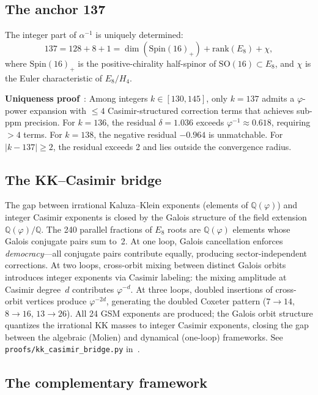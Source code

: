 \documentclass[aps,prd,twocolumn,superscriptaddress,nofootinbib,showpacs]{revtex4-2}
\begin{document}
\subsection{The anchor 137}\label{sec:anchor137}

The integer part of $\alpha^{-1}$ is uniquely determined:
\begin{equation}
137 = 128 + 8 + 1 = \dim(\text{Spin}(16)_+) + \text{rank}(E_8) + \chi,
\label{eq:137}
\end{equation}
where $\text{Spin}(16)_+$ is the positive-chirality half-spinor of
$\mathrm{SO}(16) \subset E_8$, and $\chi$ is the Euler characteristic
of $E_8/H_4$.

\textbf{Uniqueness proof}~\cite{GSMrepo}: Among integers
$k \in [130,145]$, only $k=137$ admits a $\varphi$-power expansion
with $\leq 4$ Casimir-structured correction terms that achieves
sub-ppm precision.  For $k = 136$, the residual $\delta = 1.036$
exceeds $\varphi^{-1} \approx 0.618$, requiring $>4$ terms.  For
$k = 138$, the negative residual $-0.964$ is unmatchable.  For
$|k - 137| \geq 2$, the residual exceeds 2 and lies outside the
convergence radius.

\subsection{The KK--Casimir bridge}\label{sec:kkcasimir}

The gap between irrational Kaluza--Klein exponents (elements of
$\mathbb{Q}(\varphi)$) and integer Casimir exponents is closed by the
Galois structure of the field extension
$\mathbb{Q}(\varphi)/\mathbb{Q}$.  The 240 parallel fractions of $E_8$
roots are $\mathbb{Q}(\varphi)$ elements whose Galois conjugate pairs
sum to~2.  At one loop, Galois cancellation enforces
\emph{democracy}---all conjugate pairs contribute equally, producing
sector-independent corrections.  At two loops, cross-orbit mixing
between distinct Galois orbits introduces integer exponents via Casimir
labeling: the mixing amplitude at Casimir degree~$d$ contributes
$\varphi^{-d}$.  At three loops, doubled insertions of cross-orbit
vertices produce $\varphi^{-2d}$, generating the doubled Coxeter
pattern ($7 \to 14$, $8 \to 16$, $13 \to 26$).  All 24 GSM exponents
are produced; the Galois orbit structure quantizes the irrational KK
masses to integer Casimir exponents, closing the gap between the
algebraic (Molien) and dynamical (one-loop) frameworks.  See
\texttt{proofs/kk\_casimir\_bridge.py} in~\cite{GSMrepo}.

\subsection{The complementary framework}\label{sec:complementary}
\end{document}
